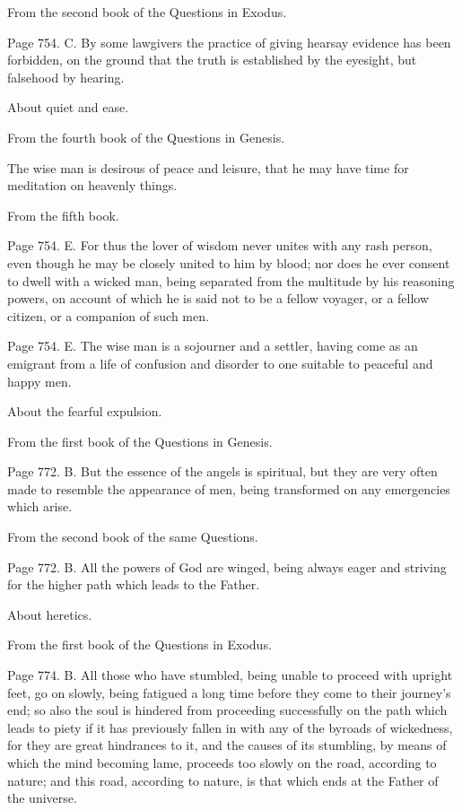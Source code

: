 From the second book of the Questions in Exodus.

Page 754. C. By some lawgivers the practice of giving hearsay evidence has been forbidden, on
the ground that the truth is established by the eyesight, but falsehood by hearing.

About quiet and ease.

From the fourth book of the Questions in Genesis.

The wise man is desirous of peace and leisure, that he may have time for meditation on heavenly
things.

From the fifth book.

Page 754. E. For thus the lover of wisdom never unites with any rash person, even though he may
be closely united to him by blood; nor does he ever consent to dwell with a wicked man, being
separated from the multitude by his reasoning powers, on account of which he is said not to be a
fellow voyager, or a fellow citizen, or a companion of such men.

Page 754. E. The wise man is a sojourner and a settler, having come as an emigrant from a life of
confusion and disorder to one suitable to peaceful and happy men.

About the fearful expulsion.

From the first book of the Questions in Genesis.

Page 772. B. But the essence of the angels is spiritual, but they are very often made to resemble
the appearance of men, being transformed on any emergencies which arise.

From the second book of the same Questions.

Page 772. B. All the powers of God are winged, being always eager and striving for the higher path
which leads to the Father.

About heretics.

From the first book of the Questions in Exodus.

Page 774. B. All those who have stumbled, being unable to proceed with upright feet, go on slowly,
being fatigued a long time before they come to their journey's end; so also the soul is hindered
from proceeding successfully on the path which leads to piety if it has previously fallen in with any
of the byroads of wickedness, for they are great hindrances to it, and the causes of its stumbling,
by means of which the mind becoming lame, proceeds too slowly on the road, according to nature;
and this road, according to nature, is that which ends at the Father of the universe.

